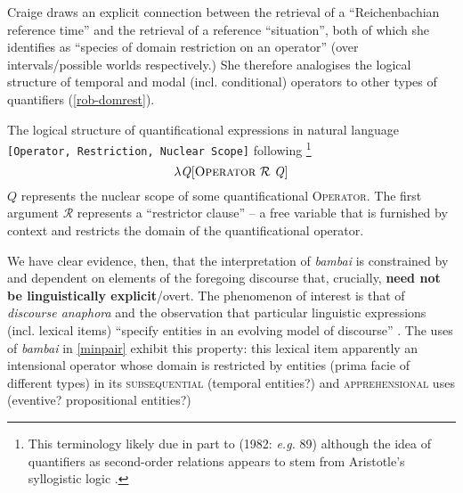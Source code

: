 {\centering{}}


\xe






 Craige \citet[663]{Roberts1995} draws an explicit connection between the retrieval of a ``Reichenbachian reference time'' and the retrieval of a reference ``situation'', both of which she identifies as ``species of domain restriction on an operator'' (over intervals/possible worlds respectively.) She therefore analogises the logical structure of temporal and modal (incl. conditional) operators to other types of quantifiers (\ref{rob-domrest}).
 
 \pex\label{rob-domrest} The logical structure of quantificational expressions in natural language\\ \texttt{[Operator,~Restriction, Nuclear Scope]} following \citet[665]{Roberts1995}\footnote{This terminology likely due in part to \citeauthor{Heim} (1982: \textit{e.g.} 89) although the idea of quantifiers as second-order relations appears to stem from Aristotle's syllogistic logic \citep[see][]{Westerstahl2019}.}
 	  $$ \lambda \mathit{Q}[\textsc{Operator}\ \mathcal R\ \mathit{Q}]$$
 	  $ \mathit{Q} $ represents the nuclear scope of some quantificational \textsc{Operator}. The first argument $ \mathcal R$ represents a ``restrictor clause'' -- a free variable that is furnished by context and restricts the domain of the quantificational operator.
\xe



We have clear evidence, then, that the interpretation of \textit{bambai} is constrained by and dependent on elements of the foregoing discourse that, crucially, \textbf{need not be linguistically explicit}/overt. The phenomenon of interest is that of \textit{discourse anaphora} and the observation that particular linguistic expressions (incl. lexical items) ``specify entities in an evolving model of discourse'' \citep[see][]{Webber1988}. The uses of \textit{bambai} in \ref{minpair} exhibit this property: this lexical item apparently an intensional operator whose domain is restricted by entities (prima facie of different types) in its \textsc{subsequential} (temporal entities?) and \textsc{apprehensional} uses (eventive? propositional entities?)


